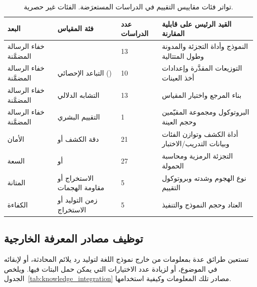 \begin{table}[t]
  \centering
  \footnotesize
  \caption{تواتر فئات مقاييس التقييم في الدراسات المستعرَضة. الفئات غير حصرية.}
  \label{tab:evaluation_metrics_overview}
  \begin{RTL}
  \begin{tabular}{|A{0.27\textwidth}|A{0.32\textwidth}|A{0.12\textwidth}|A{0.20\textwidth}|}
    \hline
    \textbf{البعد} & \textbf{فئة المقياس} & \textbf{عدد الدراسات} & \textbf{القيد الرئيس على قابلية المقارنة} \\
    \hline
    خفاء الرسالة المضمَّنة &  & 13 & النموذج وأداة التجزئة والمدونة وطول المتتالية \\\hline
    خفاء الرسالة المضمَّنة & التباعد الإحصائي () & 10 & التوزيعات المقدَّرة وإعدادات أخذ العينات \\\hline
    خفاء الرسالة المضمَّنة & التشابه الدلالي & 13 & بناء المرجع واختيار المقياس \\\hline
    خفاء الرسالة المضمَّنة & التقييم البشري & 1 & البروتوكول ومجموعة المقيّمين وحجم العينة \\\hline
    الأمان & دقة الكشف أو  & 21 & أداة الكشف وتوازن الفئات وبيانات التدريب/الاختبار \\\hline
    السعة &  أو  & 27 & التجزئة الرمزية ومحاسبة الحمولة \\\hline
    المتانة & الاستخراج أو مقاومة الهجمات & 5 & نوع الهجوم وشدته وبروتوكول التقييم \\\hline
    الكفاءة & زمن التوليد أو الاستخراج & 5 & العتاد وحجم النموذج والتنفيذ \\
    \hline
  \end{tabular}
  \end{RTL}
\end{table}

\subsection{توظيف مصادر المعرفة الخارجية}
\label{sec:related-rq4}

تستعين طرائق عدة بمعلومات من خارج نموذج اللغة لتوليد رد يلائم المحادثة، أو لإبقائه في الموضوع، أو لزيادة عدد الاختيارات التي يمكن حمل البتات فيها. ويلخص الجدول~\ref{tab:knowledge_integration} مصادر تلك المعلومات وكيفية استخدامها.

